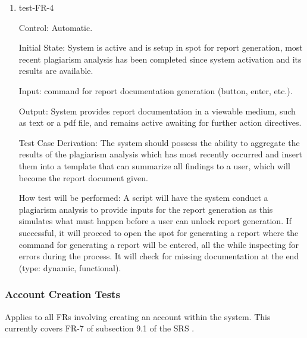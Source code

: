 \documentclass[12pt, titlepage]{article}
\begin{document}
\begin{enumerate}

\item{test-FR-4\\}

Control: Automatic.
					
Initial State: System is active and is setup in spot for report generation, 
most recent plagiarism analysis has been completed since system activation 
and its results are available.
					
Input: command for report documentation generation (button, enter, etc.).
					
Output: System provides report documentation in a viewable medium, such
as text or a pdf file, and remains active awaiting for further action 
directives.

Test Case Derivation: The system should possess the ability to aggregate
the results of the plagiarism analysis which has most recently occurred 
and insert them into a template that can summarize all findings to a user,
which will become the report document given.

How test will be performed: A script will have the system conduct a 
plagiarism analysis to provide inputs for the report generation as this
simulates what must happen before a user can unlock report generation. 
If successful, it will proceed to open the spot for generating a report 
where the command for generating a report will be entered, all the while 
inspecting for errors during the process. It will check for missing 
documentation at the end (type: dynamic, functional).			

\end{enumerate}

\subsubsection{Account Creation Tests}

Applies to all FRs involving creating an account within the system. This currently
covers FR-7 of subsection 9.1 of the SRS \citep{SRS}.
\end{document}
